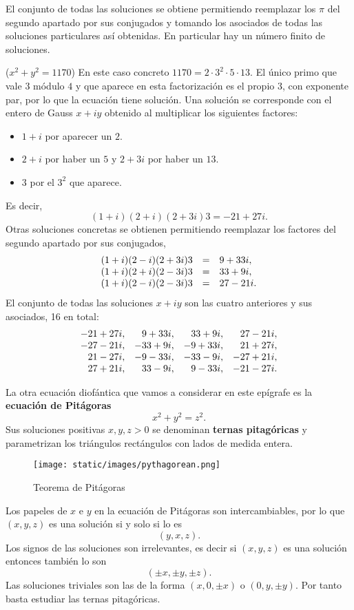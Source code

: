 El conjunto de todas las soluciones se obtiene permitiendo reemplazar
los \(\pi\) del segundo apartado por sus conjugados y tomando los
asociados de todas las soluciones particulares así obtenidas. En
particular hay un número finito de soluciones. 

\textrm{\normalfont ($x^2+y^2=1170$)} En este caso
concreto \(1170=2\cdot 3^2\cdot 5\cdot 13\). El único primo que vale
\(3\) módulo \(4\) y que aparece en esta factorización es el propio
\(3\), con exponente par, por lo que la ecuación tiene solución. Una
solución se corresponde con el entero de Gauss \(x+iy\) obtenido al
multiplicar los siguientes factores:

\begin{itemize}
\item
  \(1+i\) por aparecer un \(2\).
\item
  \(2+i\) por haber un \(5\) y \(2+3i\) por haber un \(13\).
\item
  \(3\) por el \(3^2\) que aparece.
\end{itemize}

Es decir, \[(1+i)(2+i)(2+3i)3=-21+27i.\] Otras soluciones concretas se
obtienen permitiendo reemplazar los factores del segundo apartado por
sus conjugados, \[\begin{array}{rcl}
(1+i)(2-i)(2+3i)3&=&9+33i,\cr
(1+i)(2+i)(2-3i)3&=&33+9i,\cr
(1+i)(2-i)(2-3i)3&=&27-21i.
\end{array}\] El conjunto de todas las soluciones \(x+iy\) son las
cuatro anteriores y sus asociados, 16 en total: \[
\begin{array}{rrrr}
-21+27i,&9+33i,&33+9i,&27-21i,\cr
-27-21i,&-33+9i,&-9+33i,&21+27i,\cr
21-27i,&-9-33i,&-33-9i,&-27+21i,\cr
27+21i,&33-9i,&9-33i,&-21-27i.
\end{array}
\]


La otra ecuación diofántica que vamos a considerar en este epígrafe es
la \textbf{ecuación de Pitágoras} \[x^2+y^2=z^2.\] Sus soluciones
positivas \(x,y,z>0\) se denominan \textbf{ternas pitagóricas} y
parametrizan los triángulos rectángulos con lados de medida entera.

\begin{figure}
\centering
\texttt{[image: static/images/pythagorean.png]}
\caption{Teorema de Pitágoras}
\end{figure}

Los papeles de \(x\) e \(y\) en la ecuación de Pitágoras son
intercambiables, por lo que \((x,y,z)\) es una solución si y solo si lo
es \[(y,x,z).\] Los signos de las soluciones son irrelevantes, es decir
si \((x,y,z)\) es una solución entonces también lo son
\[(\pm x,\pm y,\pm z).\] Las soluciones triviales son las de la forma
\((x,0,\pm x)\) o \((0,y,\pm y)\). Por tanto basta estudiar las ternas
pitagóricas.

